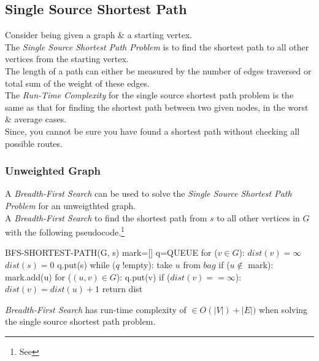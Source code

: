 \documentclass[11pt,a4paper]{article}
\begin{document}
\subsection{Single Source Shortest Path}

Consider being given a graph \& a starting vertex.\\
The \textit{Single Source Shortest Path Problem} is to find the shortest path to all other vertices from the starting vertex.\\
\nb The length of a path can either be measured by the number of edges traversed or total sum of the weight of these edges.\\

The \textit{Run-Time Complexity} for the single source shortest path problem is the same as that for finding the shortest path between two given nodes, in the worst \& average cases.\\
Since, you cannot be sure you have found a shortest path without checking all possible routes.

\newpage
\subsubsection{Unweighted Graph}

A \textit{Breadth-First Search} can be used to solve the \textit{Single Source Shortest Path Problem} for an unweigthted graph.\\
A \textit{Breadth-First Search} to find the shortest path from $s$ to all other vertices in $G$ with the following pseudocode.\footnote{See {}}
\begin{code}
BFS-SHORTEST-PATH(G, s)
mark=[]
q=QUEUE
for ($v\in G$):
  $dist(v)=\infty$
$dist(s)=0$
q.put(s)
while ($q$ !empty):
  take $u$ from $bag$
  if ($u\not\in$ mark):
    mark.add(u)
    for ($(u,v)\in G$):
      q.put(v)
      if ($dist(v)==\infty$):
        $dist(v)=dist(u)+1$
return dist
\end{code}

\textit{Breadth-First Search} has run-time complexity of $\in O(|V|)+|E|)$ when solving the single source shortest path problem.\\
\end{document}
